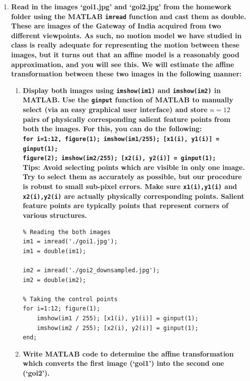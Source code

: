 \documentclass{article}
\begin{document}
\begin{enumerate}
\item \textbf{Read in the images `goi1.jpg' and `goi2.jpg' from the homework folder using the MATLAB \texttt{imread} function and cast them as double. These are images of the Gateway of India acquired from two different viewpoints. As such, no motion model we have studied in class is really adequate for representing the motion between these images, but it turns out that an affine model is a reasonably good approximation, and you will see this. We will estimate the affine transformation between these two images in the following manner:}
\begin{enumerate}
\item \textbf{Display both images using \texttt{imshow(im1)} and \texttt{imshow(im2)} in MATLAB. Use the \texttt{ginput} function of MATLAB to manually select (via an easy graphical user interface) and store $n = 12$ pairs of physically corresponding salient feature points from both the images. For this, you can do the following: \\
\texttt{for i=1:12, figure(1); imshow(im1/255); [x1(i), y1(i)] = ginput(1); \\ figure(2); imshow(im2/255); [x2(i), y2(i)] = ginput(1);}\\
\textbf{Tips:} Avoid selecting points which are visible in only one image. Try to select them as accurately as possible, but our procedure is robust to small sub-pixel errors. Make sure \texttt{x1(i),y1(i)} and \texttt{x2(i),y2(i)} are actually physically corresponding points. Salient feature points are typically points that represent corners of various structures. }


\begin{verbatim}
% Reading the both images
im1 = imread('./goi1.jpg');
im1 = double(im1);

im2 = imread('./goi2_downsampled.jpg');
im2 = double(im2);

% Taking the control points
for i=1:12; figure(1);
    imshow(im1 / 255); [x1(i), y1(i)] = ginput(1);
    imshow(im2 / 255); [x2(i), y2(i)] = ginput(1);
end;
\end{verbatim}


\item \textbf{Write MATLAB code to determine the affine transformation which converts the first image (`goi1') into the second one (`goi2'). }



\end{enumerate}
\end{enumerate}
\end{document}
